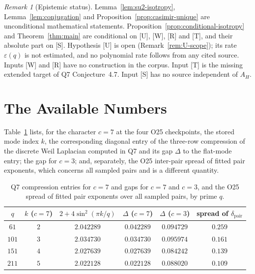 \documentclass[12pt,a4paper]{article}
\theoremstyle{definition}
\theoremstyle{remark}
\newtheorem{remark}[theorem]{Remark}
\newcommand{\dpair}{\delta_{\mathrm{pair}}}
\begin{document}
      \begin{remark}[Epistemic status]\label{rem:epistemic}
        Lemma~\ref{lem:su2-isotropy}, Lemma~\ref{lem:conjugation} and Proposition~\ref{prop:casimir-unique} are
        unconditional mathematical statements.
        Proposition~\ref{prop:conditional-isotropy} and Theorem~\ref{thm:main} are conditional on [U], [W], [R] and
        [T], and their absolute part on [S].
        Hypothesis [U] is open (Remark~\ref{rem:U-scope}); its rate $\varepsilon(q)$ is not estimated, and no
        polynomial rate follows from any cited source.
        Inputs [W] and [R] have no construction in the corpus.
        Input [T] is the missing extended target of Q7 Conjecture~4.7.
        Input [S] has no source independent of $A_H$.
      \end{remark}

  \section{The Available Numbers}\label{sec:numerical}

    Table~\ref{tab:o25} lists, for the character $c = 7$ at the four O25 checkpoints, the stored mode index $k$, the
    corresponding diagonal entry of the three-row compression of the discrete Weil Laplacian computed in Q7 and its
    gap $\Delta$ to the flat-mode entry; the gap for $c = 3$; and, separately, the O25 inter-pair spread of fitted
    pair exponents, which concerns all sampled pairs and is a different quantity.

    \begin{table}[h]
      \centering
      \caption{Q7 compression entries for $c = 7$ and gaps for $c = 7$ and $c = 3$, and the O25 spread of fitted
      pair exponents over all sampled pairs, by prime $q$.}
      \label{tab:o25}
      \begin{tabular}{cccccc}
        \toprule
        $q$ & $k$ ($c=7$) & $2 + 4\sin^2(\pi k/q)$ & $\Delta$ ($c=7$) & $\Delta$ ($c=3$) & spread of $\dpair$ \\
        \midrule
        $61$  & $2$ & $2.042289$ & $0.042289$ & $0.094729$ & $0.259$ \\
        $101$ & $3$ & $2.034730$ & $0.034730$ & $0.095974$ & $0.161$ \\
        $151$ & $4$ & $2.027639$ & $0.027639$ & $0.084242$ & $0.139$ \\
        $211$ & $5$ & $2.022128$ & $0.022128$ & $0.088020$ & $0.109$ \\
        \bottomrule
      \end{tabular}
    \end{table}
\end{document}
